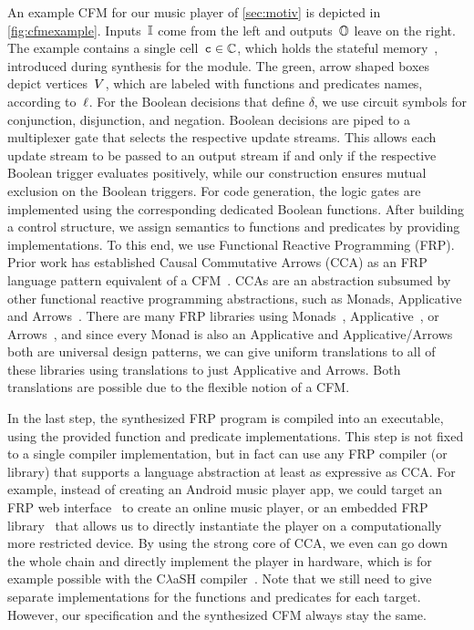 An example CFM for our music player of \cref{sec:motiv} is depicted in
\cref{fig:cfmexample}. Inputs~$ \mathbb{I} $ come from the left
and outputs~$ \mathbb{O} $ leave on the right. The example
contains a single cell~$ {\text{\texttt{c}}} \in \mathbb{C} $, which holds the
stateful memory~, introduced during synthesis for the
module. The green, arrow shaped boxes depict vertices~$ V $,
which are labeled with functions and predicates names, according
to~$ \ell $. For the Boolean decisions that define $\delta$, we use circuit symbols for
conjunction, disjunction, and negation. Boolean decisions are piped to
a multiplexer gate that selects the respective
update streams. This allows each update stream to be passed to an output stream if and only if the
respective Boolean trigger evaluates positively, while
our construction ensures mutual exclusion on the Boolean triggers. For
code generation, the logic gates are implemented using the corresponding dedicated Boolean functions.
After building a control structure, we assign semantics to functions
and predicates by providing implementations.  To this end, we use
Functional Reactive Programming (FRP).  Prior work has established
Causal Commutative Arrows (CCA) as an FRP language pattern equivalent
of a CFM~\cite{jfp/LiuCH11,liu2007plugging,yallop2016causal}.  CCAs
are an abstraction subsumed by other functional reactive programming
abstractions, such as Monads, Applicative and
Arrows~\cite{jfp/LiuCH11,lindley2011idioms}.
There are many FRP libraries using
Monads~\cite{elm,hudakFRAN,ploeg2015frpnow},
Applicative~\cite{reactivebanana,clash2015,helbling2016juniper,Reflex},
or Arrows~\cite{courtney2003yampa,murphy2016livefrp,perez2016yampa,UISF},
and since every Monad is also an Applicative and Applicative/Arrows both are universal design patterns, we can give uniform
translations to all of these libraries using translations to just Applicative
and Arrows. Both translations are possible due to the flexible notion of a CFM.

In the last step, the synthesized FRP program is compiled into an
executable, using the provided function and predicate
implementations. This step is not fixed to a single
compiler implementation, but in fact can use any FRP compiler (or
library) that supports a language abstraction at least as expressive as CCA.
For example, instead of creating an Android music player app, we could
target an FRP web interface~\cite{Reflex} to create an online music
player, or an embedded FRP library~\cite{helbling2016juniper} that
allows us to directly instantiate the player on a computationally more
restricted device. By using the strong core of CCA, we even can go
down the whole chain and directly implement the player in hardware,
which is for example possible with the C$ \lambda $aSH  compiler~\cite{clash2015}.
Note that we still need to give separate implementations for the functions and
predicates for each target. However, our specification and the
synthesized CFM always stay the same.
